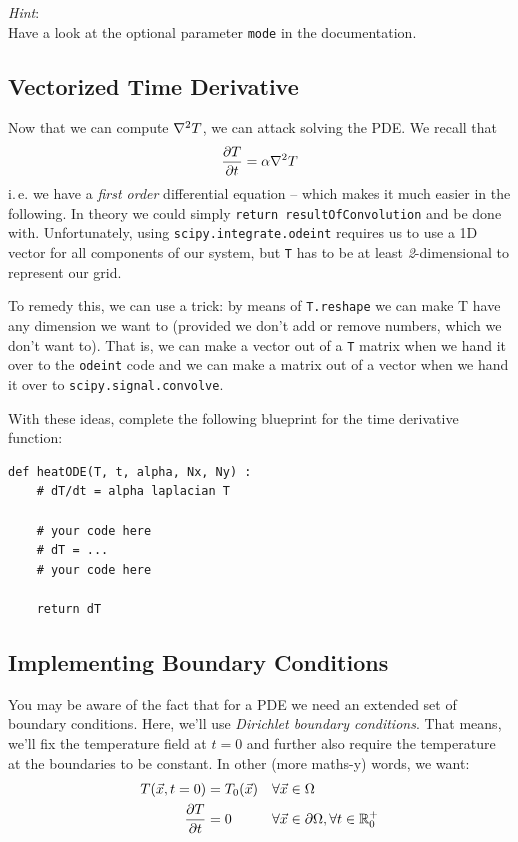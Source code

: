 \documentclass[
	english,
	fontsize=10pt,
	parskip=half,
	titlepage=true,
	DIV=12
]{scrartcl}
\newcommand*{\inPy}[1]{\texttt{#1}}
\newcommand*{\ie}{i.\,e. }
\begin{document}
\emph{Hint}:\\
Have a look at the optional parameter \texttt{mode} in the documentation.

\subsection{Vectorized Time Derivative}
Now that we can compute $\laplacian T$, we can attack solving the PDE. We recall that
\[ \pdv{T}{t} = \alpha \laplacian T \]
\ie we have a \emph{first order} differential equation -- which makes it much easier in the following. In theory we could simply \inPy{return resultOfConvolution} and be done with. Unfortunately, using \texttt{scipy.integrate.odeint} requires us to use a 1D vector for all components of our system, but \texttt{T} has to be at least \emph{2}-dimensional to represent our grid.

To remedy this, we can use a trick: by means of \texttt{T.reshape} we can make T have any dimension we want to (provided we don't add or remove numbers, which we don't want to). That is, we can make a vector out of a \texttt{T} matrix when we hand it over to the \texttt{odeint} code and we can make a matrix out of a vector when we hand it over to \texttt{scipy.signal.convolve}.

With these ideas, complete the following blueprint for the time derivative function:
\begin{verbatim}
def heatODE(T, t, alpha, Nx, Ny) :
    # dT/dt = alpha laplacian T

    # your code here
    # dT = ...
    # your code here
    
    return dT
\end{verbatim}

\subsection{Implementing Boundary Conditions}
You may be aware of the fact that for a PDE we need an extended set of boundary conditions. Here, we'll use \emph{Dirichlet boundary conditions}. That means, we'll fix the temperature field at $t = 0$ and further also require the temperature at the boundaries to be constant. In other (more maths-y) words, we want:
\begin{align*}
	T(\vec{x}, t = 0) &= T_0(\vec{x}) 
	&&
	\forall \vec{x} \in \Omega
\\
	\pdv{T}{t}(\vec{x}) &= 0
	&&
	\forall \vec{x} \in \partial \Omega, \forall t \in \mathbb{R}_{0}^{+}
\end{align*}
\end{document}
